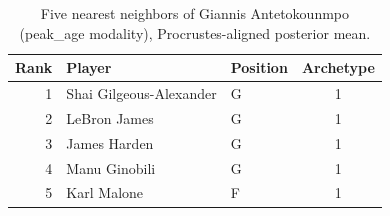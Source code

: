 \begin{table}[htbp]
  \centering\small
  \begin{tabular}{rllc}
    \toprule
    Rank & Player & Position & Archetype \\
    \midrule
    1 & Shai Gilgeous-Alexander & G & 1 \\
    2 & LeBron James & G & 1 \\
    3 & James Harden & G & 1 \\
    4 & Manu Ginobili & G & 1 \\
    5 & Karl Malone & F & 1 \\
    \bottomrule
  \end{tabular}
  \caption{Five nearest neighbors of Giannis Antetokounmpo (peak_age modality), Procrustes-aligned posterior mean.}
  \label{tab:Giannis_Antetokounmpo_neighbors_peak_age}
\end{table}

